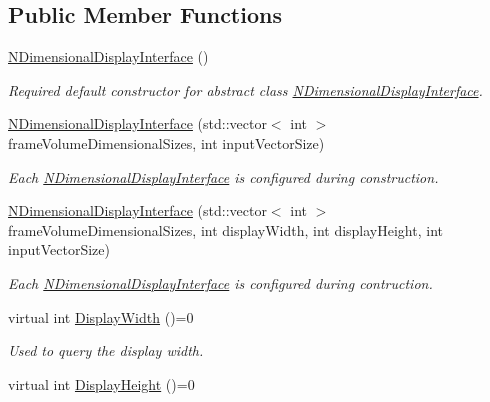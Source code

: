 \subsection*{Public Member Functions}
\begin{DoxyCompactItemize}
\item 
\hyperlink{classnddi_1_1_n_dimensional_display_interface_a64e42dc6ed54e068a6a41b4600396579}{NDimensionalDisplayInterface} ()
\begin{DoxyCompactList}\small\item\em Required default constructor for abstract class \hyperlink{classnddi_1_1_n_dimensional_display_interface}{NDimensionalDisplayInterface}. \item\end{DoxyCompactList}\item 
\hyperlink{classnddi_1_1_n_dimensional_display_interface_a75c736d5303f062ee9e2c1552352e8be}{NDimensionalDisplayInterface} (std::vector$<$ int $>$ frameVolumeDimensionalSizes, int inputVectorSize)
\begin{DoxyCompactList}\small\item\em Each \hyperlink{classnddi_1_1_n_dimensional_display_interface}{NDimensionalDisplayInterface} is configured during construction. \item\end{DoxyCompactList}\item 
\hyperlink{classnddi_1_1_n_dimensional_display_interface_affffd4fb4dbef87259fcc9cf1a170dbc}{NDimensionalDisplayInterface} (std::vector$<$ int $>$ frameVolumeDimensionalSizes, int displayWidth, int displayHeight, int inputVectorSize)
\begin{DoxyCompactList}\small\item\em Each \hyperlink{classnddi_1_1_n_dimensional_display_interface}{NDimensionalDisplayInterface} is configured during contruction. \item\end{DoxyCompactList}\item 
virtual int \hyperlink{classnddi_1_1_n_dimensional_display_interface_a0bb9a854f2b5efc26ed8bbd79833502e}{DisplayWidth} ()=0
\begin{DoxyCompactList}\small\item\em Used to query the display width. \item\end{DoxyCompactList}\item 
virtual int \hyperlink{classnddi_1_1_n_dimensional_display_interface_a7c05ce89a99f5902d1efac37f28d670f}{DisplayHeight} ()=0

\end{DoxyCompactItemize}
